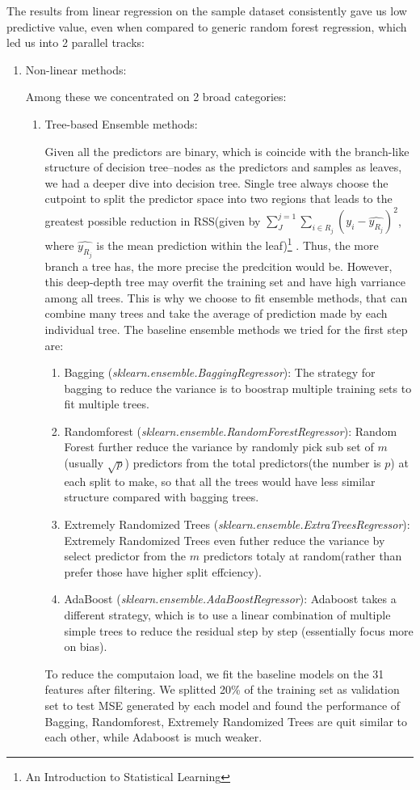 \documentclass[11pt]{article}
\begin{document}
The results from linear regression on the sample dataset consistently gave us low predictive value, even when compared to generic random forest regression, which led us into 2 parallel tracks:

\begin{enumerate}

\item Non-linear methods: 

Among these we concentrated on 2 broad categories:

\begin{enumerate}

\item Tree-based Ensemble methods: 

Given all the predictors are binary, which is coincide with the branch-like structure of decision tree--nodes as the predictors and samples as leaves, we had a deeper dive into decision tree. Single tree always choose the cutpoint to split the predictor space into two regions that leads to the greatest possible reduction in RSS(given by $\sum_{J}^{j=1}\sum_{i\in R_{j}}(y_{i}-\hat{y_{R_{j}}})^{2}$, where $\hat{y_{R_{j}}}$ is the mean prediction within the leaf)\footnote{An Introduction to Statistical Learning} . Thus, the more branch a tree has, the more precise the predcition would be. However, this deep-depth tree may overfit the training set and have high varriance among all trees. This is why we choose to fit ensemble methods, that can combine many trees and take the average of prediction made by each individual tree. 
The baseline ensemble methods we tried for the first step are:
\begin{enumerate}
\item Bagging (\emph{sklearn.ensemble.BaggingRegressor}): The strategy for bagging to reduce the variance is to boostrap multiple training sets to fit multiple trees.
\item Randomforest (\emph{sklearn.ensemble.RandomForestRegressor}): Random Forest further reduce the variance by randomly pick sub set of $\mathit{m}$ (usually $\sqrt{p}$) predictors from the total predictors(the number is $\mathit{p}$) at each split to make, so that all the trees would have less similar structure compared with bagging trees.
\item Extremely Randomized Trees (\emph{sklearn.ensemble.ExtraTreesRegressor}): Extremely Randomized Trees even futher reduce the variance by select predictor from the $\mathit{m}$ predictors totaly at random(rather than prefer those have higher split effciency). 
\item AdaBoost (\emph{sklearn.ensemble.AdaBoostRegressor}): Adaboost takes a different strategy, which is to use a linear combination of multiple simple trees to reduce the residual step by step (essentially focus more on bias). 
\end{enumerate}
To reduce the computaion load, we fit the baseline models on the 31 features after filtering. We splitted 20\% of the training set as validation set to test MSE generated by each model and found the performance of Bagging, Randomforest, Extremely Randomized Trees are quit similar to each other, while Adaboost is much weaker. 


\end{enumerate}
\end{enumerate}
\end{document}
